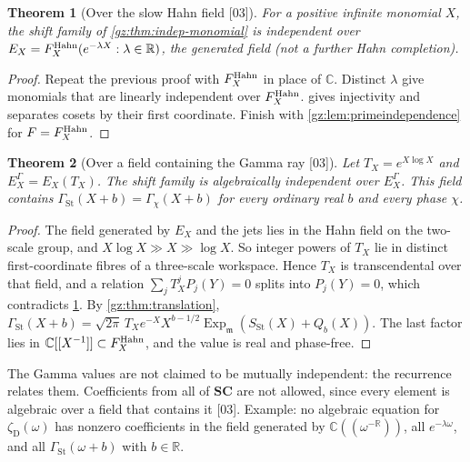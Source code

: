 \documentclass[11pt,a4paper]{article}
\numberwithin{equation}{section}
\newtheorem{theorem}{Theorem}[section]
\theoremstyle{definition}
\theoremstyle{remark}
\newcommand{\SC}{\mathbf{SC}}
\newcommand{\R}{\mathbb R}
\newcommand{\C}{\mathbb C}
\newcommand{\mm}{\mathfrak m}
\newcommand{\Ex}{\operatorname{Exp}_{\mm}}
\newcommand{\GSt}{\Gamma_{\mathrm{St}}}
\newcommand{\SSt}{S_{\mathrm{St}}}
\newcommand{\zD}{\zeta_{\mathrm D}}
\newcommand{\src}[1]{\textup{[#1]}}
\begin{document}
\begin{theorem}[Over the slow Hahn field \src{03}]\label{gz:thm:indep-slow}
For a positive infinite monomial $X$, the shift family of
\cref{gz:thm:indep-monomial} is independent over
$E_X=F^{\rm Hahn}_X(e^{-\lambda X}:\lambda\in\R)$, the generated field (not a
further Hahn completion).
\end{theorem}
\begin{proof}
Repeat the previous proof with $F^{\rm Hahn}_X$ in place of $\C$. Distinct
$\lambda$ give monomials that are linearly independent over $F^{\rm Hahn}_X$.
 gives injectivity and separates cosets by their first
coordinate. Finish with \cref{gz:lem:primeindependence} for $F=F^{\rm Hahn}_X$.
\end{proof}

\begin{theorem}[Over a field containing the Gamma ray \src{03}]\label{gz:thm:gamma-zeta-independence}
Let $T_X=e^{X\log X}$ and $E_X^\Gamma=E_X(T_X)$. The shift family is
algebraically independent over $E_X^\Gamma$. This field contains
$\GSt(X+b)=\Gamma_\chi(X+b)$ for every ordinary real $b$ and every phase
$\chi$.
\end{theorem}
\begin{proof}
The field generated by $E_X$ and the jets lies in the Hahn field on the
two-scale group, and $X\log X\gg X\gg\log X$. So integer powers of $T_X$ lie
in distinct first-coordinate fibres of a three-scale workspace. Hence $T_X$
is transcendental over that field, and a relation $\sum_jT_X^jP_j(Y)=0$
splits into $P_j(Y)=0$, which contradicts \cref{gz:thm:indep-slow}. By
\cref{gz:thm:translation},
$\GSt(X+b)=\sqrt{2\pi}\,T_Xe^{-X}X^{b-1/2}\Ex(\SSt(X)+Q_b(X))$. The last factor
lies in $\C[[X^{-1}]]\subset F^{\rm Hahn}_X$, and the value is real and
phase-free.
\end{proof}
The Gamma values are not claimed to be mutually independent: the recurrence
relates them. Coefficients from all of $\SC$ are not allowed, since every
element is algebraic over a field that contains it \src{03}. Example: no
algebraic equation for $\zD(\omega)$ has nonzero coefficients in the field
generated by $\C((\omega^{-\R}))$, all $e^{-\lambda\omega}$, and all
$\GSt(\omega+b)$ with $b\in\R$.
\end{document}
